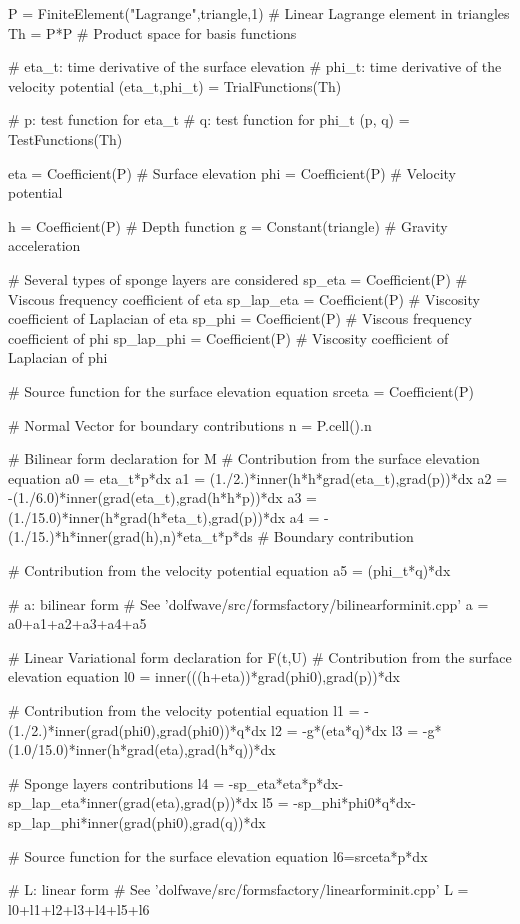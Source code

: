 \begin{python}
P = FiniteElement("Lagrange",triangle,1) # Linear Lagrange element in triangles
Th = P*P # Product space for basis functions

# eta_t: time derivative of the surface elevation
# phi_t: time derivative of the velocity potential
(eta_t,phi_t) = TrialFunctions(Th)

# p: test function for eta_t
# q: test function for phi_t
(p, q) = TestFunctions(Th)

eta = Coefficient(P) # Surface elevation
phi = Coefficient(P) # Velocity potential

h = Coefficient(P) # Depth function
g = Constant(triangle) # Gravity acceleration

# Several types of sponge layers are considered
sp_eta = Coefficient(P) # Viscous frequency coefficient of eta
sp_lap_eta = Coefficient(P) # Viscosity coefficient of Laplacian of eta
sp_phi = Coefficient(P) # Viscous frequency coefficient of phi
sp_lap_phi = Coefficient(P) # Viscosity coefficient of Laplacian of phi

# Source function for the surface elevation equation
srceta = Coefficient(P)

# Normal Vector for boundary contributions
n = P.cell().n

# Bilinear form declaration for M
# Contribution from the surface elevation equation
a0 = eta_t*p*dx
a1 = (1./2.)*inner(h*h*grad(eta_t),grad(p))*dx
a2 = -(1./6.0)*inner(grad(eta_t),grad(h*h*p))*dx
a3 = (1./15.0)*inner(h*grad(h*eta_t),grad(p))*dx
a4 = -(1./15.)*h*inner(grad(h),n)*eta_t*p*ds # Boundary contribution

# Contribution from the velocity potential equation
a5 = (phi_t*q)*dx

# a: bilinear form
# See 'dolfwave/src/formsfactory/bilinearforminit.cpp'
a = a0+a1+a2+a3+a4+a5

# Linear Variational form declaration for F(t,U)
# Contribution from the surface elevation equation
l0 = inner(((h+eta))*grad(phi0),grad(p))*dx

# Contribution from the velocity potential equation
l1 = -(1./2.)*inner(grad(phi0),grad(phi0))*q*dx
l2 = -g*(eta*q)*dx
l3 = -g*(1.0/15.0)*inner(h*grad(eta),grad(h*q))*dx

# Sponge layers contributions
l4 = -sp_eta*eta*p*dx-sp_lap_eta*inner(grad(eta),grad(p))*dx
l5 = -sp_phi*phi0*q*dx-sp_lap_phi*inner(grad(phi0),grad(q))*dx

# Source function for the surface elevation equation
l6=srceta*p*dx

# L: linear form
# See 'dolfwave/src/formsfactory/linearforminit.cpp'
L = l0+l1+l2+l3+l4+l5+l6
\end{python}

